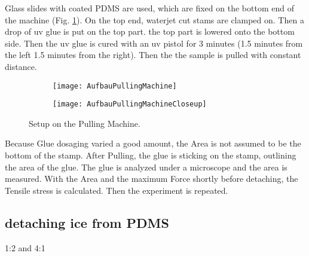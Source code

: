 Glass slides with coated PDMS are used, which are fixed on the bottom end of the machine (Fig. \ref{fig:PullingMachineSetup}). On the top end, waterjet cut stams are clamped on. Then a drop of uv glue is put on the top part. the top part is lowered onto the bottom side. Then the uv glue is cured with an uv pistol for 3 minutes (1.5 minutes from the left 1.5 minutes from the right). Then the the sample is pulled with constant distance.

\begin{figure}[hbt!]
	\centering
	\begin{subfigure}[]{0.45\textwidth}
		\centering
		\texttt{[image: AufbauPullingMachine]}
		\caption{}
	\end{subfigure}
	\begin{subfigure}[]{0.45\textwidth}
		\centering
		\texttt{[image: AufbauPullingMachineCloseup]}
		\caption{}
	\end{subfigure}
	\caption{Setup on the Pulling Machine.}
	\label{fig:PullingMachineSetup}
\end{figure}

Because Glue dosaging varied a good amount, the Area is not assumed to be the bottom of the stamp. After Pulling, the glue is sticking on the stamp, outlining the area of the glue. The glue is analyzed under a microscope and the area is measured. With the Area and the maximum Force shortly before detaching, the Tensile stress is calculated. Then the experiment is repeated.



\subsection{detaching ice from PDMS}

1:2 and 4:1

